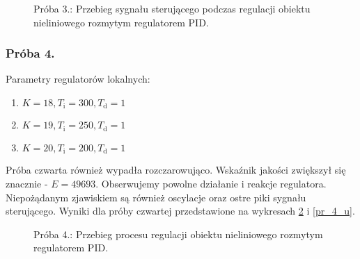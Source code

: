 \begin{figure}[b]
    \centering
    \caption{Próba 3.: Przebieg sygnału sterującego podczas regulacji obiektu nieliniowego rozmytym regulatorem PID.}
    \label{pr_3_u}
\end{figure}


\subsubsection{Próba 4.}
Parametry regulatorów lokalnych:
\begin{enumerate}
\item $K = 18, T_{\mathrm{i}} = 300,  T_{\mathrm{d}} = 1$
\item $K = 19, T_{\mathrm{i}} = 250,  T_{\mathrm{d}} = 1$
\item $K = 20, T_{\mathrm{i}} = 200,  T_{\mathrm{d}} = 1$
\end{enumerate}
Próba czwarta również wypadła rozczarowująco. 
Wskaźnik jakości zwiększył się znacznie - $E = \num{49693}$. 
Obserwujemy powolne działanie i reakcje regulatora. 
Niepożądanym zjawiskiem są również oscylacje oraz ostre piki sygnału sterującego. 
Wyniki dla próby czwartej przedstawione na wykresach \ref{pr_4_y} i \ref{pr_4_u}.

\begin{figure}[t]
    \centering
    \caption{Próba 4.: Przebieg procesu regulacji obiektu nieliniowego rozmytym regulatorem PID.}
    \label{pr_4_y}
\end{figure}

